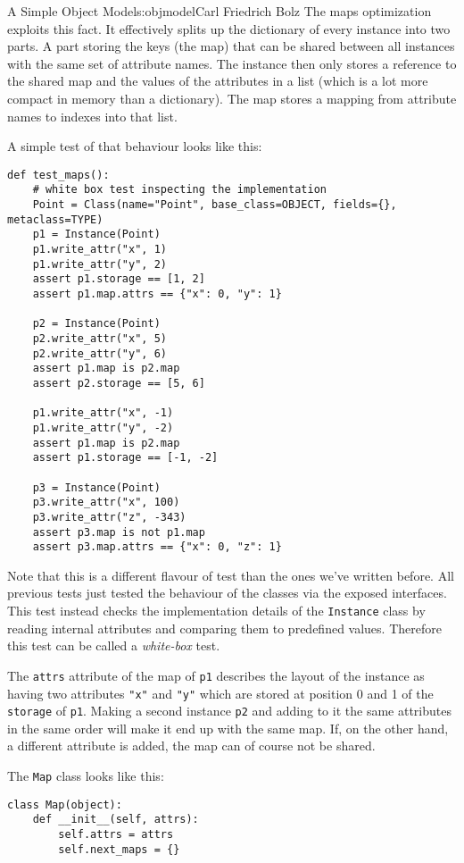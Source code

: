 \begin{aosachapter}{A Simple Object Model}{s:objmodel}{Carl Friedrich Bolz}
The maps optimization exploits this fact. It effectively splits up the
dictionary of every instance into two parts. A part storing the keys
(the map) that can be shared between all instances with the same set of
attribute names. The instance then only stores a reference to the shared
map and the values of the attributes in a list (which is a lot more
compact in memory than a dictionary). The map stores a mapping from
attribute names to indexes into that list.

A simple test of that behaviour looks like this:

\begin{verbatim}
def test_maps():
    # white box test inspecting the implementation
    Point = Class(name="Point", base_class=OBJECT, fields={}, metaclass=TYPE)
    p1 = Instance(Point)
    p1.write_attr("x", 1)
    p1.write_attr("y", 2)
    assert p1.storage == [1, 2]
    assert p1.map.attrs == {"x": 0, "y": 1}

    p2 = Instance(Point)
    p2.write_attr("x", 5)
    p2.write_attr("y", 6)
    assert p1.map is p2.map
    assert p2.storage == [5, 6]

    p1.write_attr("x", -1)
    p1.write_attr("y", -2)
    assert p1.map is p2.map
    assert p1.storage == [-1, -2]

    p3 = Instance(Point)
    p3.write_attr("x", 100)
    p3.write_attr("z", -343)
    assert p3.map is not p1.map
    assert p3.map.attrs == {"x": 0, "z": 1}
\end{verbatim}

Note that this is a different flavour of test than the ones we've
written before. All previous tests just tested the behaviour of the
classes via the exposed interfaces. This test instead checks the
implementation details of the \texttt{Instance} class by reading
internal attributes and comparing them to predefined values. Therefore
this test can be called a \emph{white-box} test.

The \texttt{attrs} attribute of the map of \texttt{p1} describes the
layout of the instance as having two attributes \texttt{"x"} and
\texttt{"y"} which are stored at position 0 and 1 of the
\texttt{storage} of \texttt{p1}. Making a second instance \texttt{p2}
and adding to it the same attributes in the same order will make it end
up with the same map. If, on the other hand, a different attribute is
added, the map can of course not be shared.

The \texttt{Map} class looks like this:

\begin{verbatim}
class Map(object):
    def __init__(self, attrs):
        self.attrs = attrs
        self.next_maps = {}


\end{verbatim}
\end{aosachapter}
